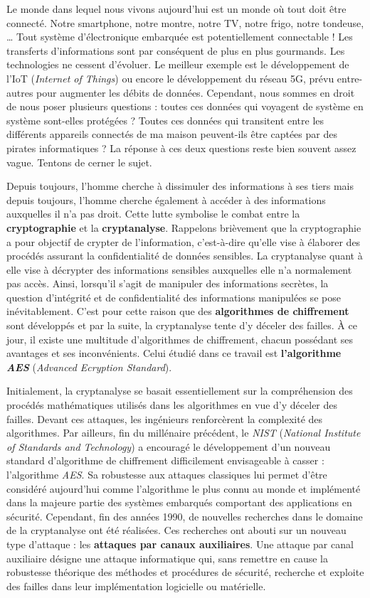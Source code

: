 \documentclass[oneside]{book}
\begin{document}
Le monde dans lequel nous vivons aujourd’hui est un monde où tout doit être connecté. Notre smartphone, notre montre, notre TV, notre frigo, notre tondeuse, … Tout système d’électronique embarquée est potentiellement connectable ! Les transferts d’informations sont par conséquent de plus en plus gourmands. Les technologies ne cessent d’évoluer. Le meilleur exemple est le développement de l'IoT (\textit{Internet of Things}) ou encore le développement du réseau 5G, prévu entre-autres pour augmenter les débits de données. Cependant, nous sommes en droit de nous poser plusieurs questions : toutes ces données qui voyagent de système en système sont-elles protégées ? Toutes ces données qui transitent entre les différents appareils connectés de ma maison peuvent-ils être captées par des pirates informatiques ? La réponse à ces deux questions reste bien souvent assez vague. Tentons de cerner le sujet.

Depuis toujours, l’homme cherche à dissimuler des informations à ses tiers mais depuis toujours, l’homme cherche également à accéder à des informations auxquelles il n’a pas droit. Cette lutte symbolise le combat entre la \textbf{cryptographie} et la \textbf{cryptanalyse}. Rappelons brièvement que la cryptographie a pour objectif de crypter de l’information, c’est-à-dire qu’elle vise à élaborer des procédés assurant la confidentialité de données sensibles. La cryptanalyse quant à elle vise à décrypter des informations sensibles auxquelles elle n'a normalement pas accès. Ainsi, lorsqu'il s'agit de manipuler des informations secrètes, la question d'intégrité et de confidentialité des informations manipulées se pose inévitablement. C'est pour cette raison que des \textbf{algorithmes de chiffrement} sont développés et par la suite, la cryptanalyse tente d'y déceler des failles. À ce jour, il existe une multitude d'algorithmes de chiffrement, chacun possédant ses avantages et ses inconvénients. Celui étudié dans ce travail est \textbf{l'algorithme \textit{AES}} (\textit{Advanced Ecryption Standard}).

Initialement, la cryptanalyse se basait essentiellement sur la compréhension des procédés mathématiques utilisés dans les algorithmes en vue d'y déceler des failles. Devant ces attaques, les ingénieurs renforcèrent la complexité des algorithmes. Par ailleurs, fin du millénaire précédent, le \textit{NIST} (\textit{National Institute of Standards and Technology}) a encouragé le développement d’un nouveau standard d’algorithme de chiffrement difficilement envisageable à casser : l’algorithme \textit{AES}. Sa robustesse aux attaques classiques lui permet d'être considéré aujourd’hui comme l'algorithme le plus connu au monde et implémenté dans la majeure partie des systèmes embarqués comportant des applications en sécurité. Cependant, fin des années 1990, de nouvelles recherches dans le domaine de la cryptanalyse ont été réalisées. Ces recherches ont abouti sur un nouveau type d'attaque : les \textbf{attaques par canaux auxiliaires}. Une attaque par canal auxiliaire désigne une attaque informatique qui, sans remettre en cause la robustesse théorique des méthodes et procédures de sécurité, recherche et exploite des failles dans leur implémentation logicielle ou matérielle. 
\end{document}
